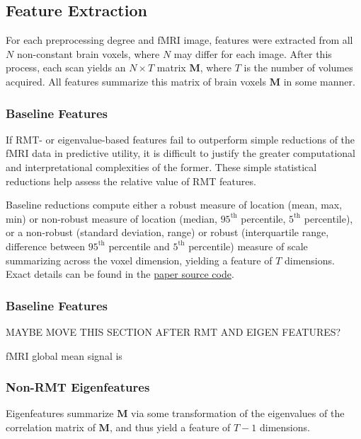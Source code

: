 \documentclass[12pt]{spieman}  %
\begin{document}
\begin{spacing}{2}
\subsection{Feature Extraction}


For each preprocessing degree and fMRI image, features were extracted from all
\(N\) non-constant brain voxels, where \(N\) may differ for each image. After
this process, each scan yields an \(N \times T\) matrix \(\mathbf{M}\), where
\(T\) is the number of volumes acquired. All features summarize this matrix
of brain voxels \(\mathbf{M}\) in some manner.


\subsubsection{Baseline Features}

If RMT- or eigenvalue-based features fail to outperform simple reductions of
the fMRI data in predictive utility, it is difficult to justify the greater
computational and interpretational complexities of the former. These simple
statistical reductions help assess the relative value of RMT features.

Baseline reductions compute either a robust measure of location (mean, max,
min) or non-robust measure of location (median, \(95^{\text{th}}\) percentile,
\(5^{\text{th}}\) percentile), or a non-robust (standard deviation, range) or
robust (interquartile range, difference between \(95^{\text{th}}\) percentile
and \(5^{\text{th}}\) percentile) measure of scale summarizing across the voxel
dimension, yielding a feature of \(T\) dimensions. Exact details can be found
in the
\href{https://github.com/DM-Berger/random-matrix-fmri/blob/master/code/rmt/enumerables.py#L51-L69}{paper
source code}.


\subsubsection{Baseline Features}
MAYBE MOVE THIS SECTION AFTER RMT AND EIGEN FEATURES?


fMRI global mean signal is

\subsubsection{Non-RMT Eigenfeatures}

Eigenfeatures summarize \(\mathbf{M}\) via some
transformation of the eigenvalues of the correlation matrix of \(\mathbf{M}\),
and thus yield a feature of  \(T - 1\) dimensions.


\end{spacing}
\end{document}
